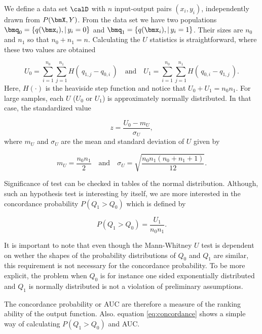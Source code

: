 We define a data set $\calD$ with $n$ input-output pairs $(x_i, y_i)$, independently drawn from $P(\bmX,Y)$.  From the data set we have two populations $\bmq_0 = \{q(\bmx_i) , | \, y_i = 0 \}$ and $\bmq_1 = \{q(\bmx_i) , | \, y_i = 1 \}$.  Their sizes are $n_0$ and $n_1$ so that $n_0 + n_1 = n$.  Calculating the $U$ statistics is straightforward, where these two values are obtained 

\begin{equation}
\label{eq:U}
U_0 = \sum_{i=1}^{n_0}\sum_{j=1}^{n_1} H(\,q_{1,j} - q_{0,i}    \,) \quad \mbox{and} \quad 
U_1 = \sum_{i=1}^{n_0}\sum_{j=1}^{n_1} H( \,q_{0,i} - q_{1,j}    \,).
\end{equation}
Here, $H(\cdot)$ is the heaviside step function and notice that $U_0 + U_1 = n_0n_1$.  For large samples, each $U$ ($U_0$ or $U_1$) is approximately normally distributed. In that case, the standardized value

\begin{equation}
\label{eq:z}
z = \frac{U_0 - m_{U}}{\sigma_{U}},
\end{equation}
where $m_U$ and $\sigma_U$ are the mean and standard deviation of $U$ given by

\begin{equation}
\label{eq:z}
m_U = \frac{n_0n_1}{2} \quad \mbox{and} \quad 
\sigma_U = \sqrt{\frac{n_0n_1(n_0 + n_1 + 1)}{12} }.
\end{equation}

Significance of test can be checked in tables of the normal distribution.  Although, such an hypothesis test is interesting by itself, we are more interested in the concordance probability $P(Q_1 > Q_0)$ which is defined by

\begin{equation}
\label{eq:concordance}
P(Q_1 > Q_0) = \frac{U_1}{n_0n_1}.
\end{equation}

It is important to note that even though the Mann-Whitney $U$ test is dependent on wether the shapes of the probability distributions of $Q_0$ and $Q_1$ are similar, this requirement is not necessary for the concordance probability.  To be more explicit, the problem when $Q_0$ is for instance one sided exponentially distributed and $Q_1$ is normally distributed is not a violation of preliminary assumptions.  

The concordance probability or AUC are therefore a measure of the ranking ability of the output function.  
Also. equation \eqref{eq:concordance} shows a simple way of calculating $P(Q_1 > Q_0)$ and AUC.

